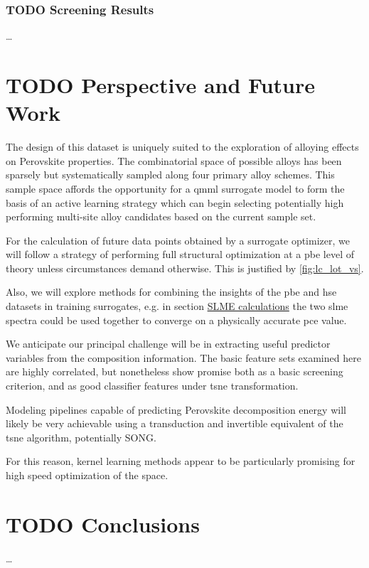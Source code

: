 \documentclass[twoside, twocolumn, 9pt, draft]{article}
\begin{document}
\subsubsection*{{\bfseries\sffamily TODO} Screening Results}
\label{sec:orgc2120ba}
\ldots{}\\

\section*{{\bfseries\sffamily TODO} Perspective and Future Work}
\label{sec:org59fdda8}
The design of this dataset is uniquely suited to the exploration of
alloying effects on Perovskite properties. The combinatorial space of
possible alloys has been sparsely but systematically sampled along
four primary alloy schemes. This sample space affords the opportunity
for a \gls{qmml} surrogate model to form the basis of an
active learning strategy which can begin selecting potentially high
performing multi-site alloy candidates based on the current sample
set.

For the calculation of future data points obtained by a surrogate
optimizer, we will follow a strategy of performing full structural
optimization at a \acrshort{pbe} level of theory unless
circumstances demand otherwise. This is justified by
\ref{fig:lc_lot_vs}.

Also, we will explore methods for combining the insights of the
\acrshort{pbe} and \acrshort{hse} datasets in training
surrogates, e.g. in section \hyperref[sec:orga002246]{SLME calculations} the two
\gls{slme} spectra could be used together to converge on a
physically accurate \acrshort{pce} value.

We anticipate our principal challenge will be in extracting useful
predictor variables from the composition information. The basic
feature sets examined here are highly correlated, but nonetheless show
promise both as a basic screening criterion, and as good classifier
features under \gls{tsne} transformation.

Modeling pipelines capable of predicting Perovskite decomposition
energy will likely be very achievable using a transduction and
invertible equivalent of the \gls{tsne} algorithm,
potentially SONG.

For this reason, kernel learning methods appear to be particularly
promising for high speed optimization of the space.

\section*{{\bfseries\sffamily TODO} Conclusions}
\label{sec:orga3c2451}
\ldots{}\\
\end{document}
